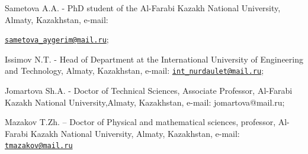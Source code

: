 \begin{authorinfo}
Sametova A.A. - PhD student of the Al-Farabi Kazakh National University,
Almaty, Kazakhstan, e-mail:

\href{mailto:sametova_aygerim@mail.ru}{\nolinkurl{sametova\_aygerim@mail.ru}};

Issimov N.T. - Head of Department at the International University of
Engineering and Technology, Almaty, Kazakhstan, e-mail:
\href{mailto:int_nurdaulet@mail.ru}{\nolinkurl{int\_nurdaulet@mail.ru}};

Jomartova Sh.A. - Doctor of Technical Sciences, Associate Professor,
Al-Farabi Kazakh National University,Almaty, Kazakhstan, e-mail:
jomartova@mail.ru;

Mazakov T.Zh. -- Doctor of Physical and mathematical sciences,
professor, Al-Farabi Kazakh National University, Almaty, Kazakhstan,
e-mail: \href{mailto:tmazakov@mail.ru}{\nolinkurl{tmazakov@mail.ru}}
\end{authorinfo}

